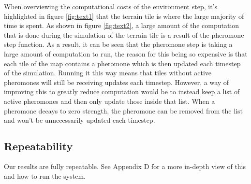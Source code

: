 When overviewing the computational costs of the environment step, it's highlighted in figure \ref{fig:text1} that the terrain tile is where the large majority of time is spent. As shown in figure \ref{fig:text2}, a large amount of the computation that is done during the simulation of the terrain tile is a result of the pheromone step function. As a result, it can be seen that the pheromone step is taking a large amount of computation to run, the reason for this being so expensive is that each tile of the map contains a pheromone which is then updated each timestep of the simulation. Running it this way means that tiles without active pheromones will still be receiving updates each timestep. However, a way of improving this to greatly reduce computation would be to instead keep a list of active pheromones and then only update those inside that list. When a pheromone decays to zero strength, the pheromone can be removed from the list and won't be unnecessarily updated each timestep.\par

\subsection{Repeatability}
Our results are fully repeatable. See Appendix D for a more in-depth view of this and how to run the system.\par
